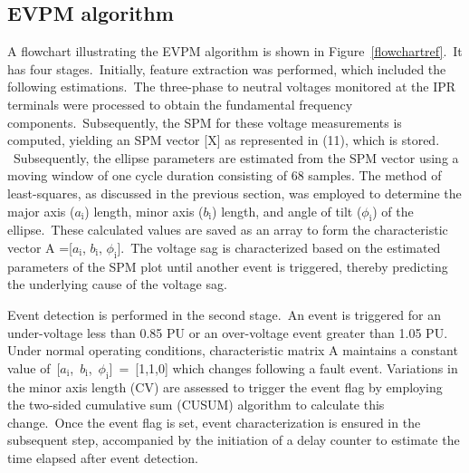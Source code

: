 \subsection{EVPM algorithm}
A flowchart illustrating the EVPM algorithm is shown in Figure~\ref {flowchartref}.~It has four stages.~Initially, feature extraction was performed, which included the following estimations.~The three-phase to neutral voltages monitored at the IPR terminals were processed to obtain the fundamental frequency components.~Subsequently, the SPM for these voltage measurements is computed, yielding an SPM vector [X] as represented in (11), which is stored. ~Subsequently, the ellipse parameters are estimated from the SPM vector using a moving window of one cycle duration consisting of 68 samples. The method of least-squares, as discussed in the previous section, was employed to determine the major axis ($a_\text{i}$) length, minor axis ($b_\text{i}$) length, and angle of tilt ($\phi_\text{i}$) of the ellipse.~These calculated values are saved as an array to form the characteristic vector A =[$a_\text{i}$, $b_\text{i}$, $\phi_\text{i}$].~The voltage sag is characterized based on the estimated parameters of the SPM plot until another event is triggered, thereby predicting the underlying cause of the voltage sag.

Event detection is performed in the second stage.~An event is triggered for an under-voltage less than 0.85 PU or an over-voltage event greater than 1.05 PU. Under normal operating conditions, characteristic matrix A maintains a constant value of~[$a_\text{i}$,~$b_\text{i}$,~$\phi_\text{i}$]~=~[1,1,0] which changes following a fault event. Variations in the minor axis length (CV) are assessed to trigger the event flag by employing the two-sided cumulative sum (CUSUM) algorithm to calculate this change\cite{basseville1993detection}.~Once the event flag is set, event characterization is ensured in the subsequent step, accompanied by the initiation of a delay counter to estimate the time elapsed after event detection.

